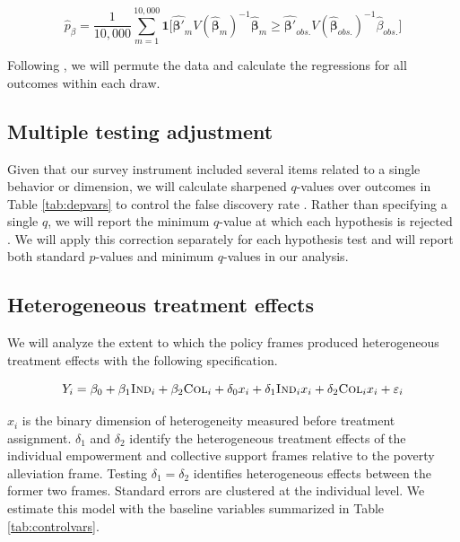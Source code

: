 \documentclass[11pt, a4paper]{article}\usepackage[]{graphicx}\usepackage[]{color}
\begin{document}
        \begin{equation} \label{eq:exactp}
            \hat{p}_{\beta} =  \frac{1}{10,000}\sum_{m=1}^{10,000} \mathbf{1} \Big [ \mathbf{\hat{\beta'}}_m V(\mathbf{\hat{\beta}}_m)^{-1} \mathbf{\hat{\beta}}_m \geq \mathbf{\hat{\beta'}}_{obs.} V(\mathbf{\hat{\beta}}_{obs.})^{-1} \hat{\beta}_{obs.} \Big ]
        \end{equation}

        Following \textcite{young_channeling_2015}, we will permute the data and calculate the regressions for all outcomes within each draw.

    \subsection{Multiple testing adjustment}

        Given that our survey instrument included several items related to a single behavior or dimension, we will calculate sharpened $q$-values over outcomes in Table \ref{tab:depvars} to control the false discovery rate \parencite{benjamini_adaptive_2006}. Rather than specifying a single $q$, we will report the minimum $q$-value at which each hypothesis is rejected \parencite{anderson_multiple_2008}. We will apply this correction separately for each hypothesis test and will report both standard $p$-values and minimum $q$-values in our analysis.

    \subsection{Heterogeneous treatment effects}

        We will analyze the extent to which the policy frames produced heterogeneous treatment effects with the following specification.

        \begin{equation}
            Y_{i} = \beta_{0} + \beta_{1}\text{\textsc{Ind}}_{i} + \beta_{2}\text{\textsc{Col}}_{i} + \delta_{0} x_i + \delta_{1}\text{\textsc{Ind}}_{i} x_i + \delta_{2}\text{\textsc{Col}}_{i} x_i + \varepsilon_{i}
        \label{eq:heteffect} \end{equation}

        $x_{i}$ is the binary dimension of heterogeneity measured before treatment assignment. $\delta_{1}$ and $\delta_{2}$ identify the heterogeneous treatment effects of the individual empowerment and collective support frames relative to the poverty alleviation frame. Testing $\delta_{1} = \delta_{2}$ identifies heterogeneous effects between the former two frames. Standard errors are clustered at the individual level. We estimate this model with the baseline variables summarized in Table \ref{tab:controlvars}.
\end{document}
